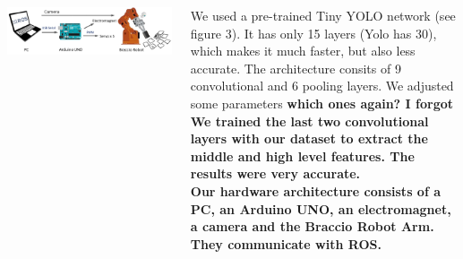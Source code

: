 \documentclass[25pt, a0paper, landscape]{tikzposter}
\begin{document}
\begin{columns}
{ 				\begin{minipage}{\columnwidth}
 					\begin{minipage}{800 pt}
			  	    	\begin{tikzfigure}
			  	    		\includegraphics[width = 800 pt]{hardware_structure2}
			  	    	\end{tikzfigure}
 					\end{minipage}
 					\hspace{50 pt}
 					\begin{minipage}{500 pt}
 						\normalfont
						We used a pre-trained Tiny YOLO network (see figure 3). It has only 15 layers (Yolo has 30), which makes it much faster, but also less accurate. The architecture consits of 9 convolutional and 6 pooling layers. We adjusted some parameters \bfseries{which ones again? I forgot}\\
						\normalfont We trained the last two convolutional layers with our dataset to extract the middle and high level features. The results were very accurate.\\
						Our hardware architecture consists of a PC, an Arduino UNO, an electromagnet, a camera and the Braccio Robot Arm. They communicate with ROS.
 					\end{minipage}
 				\end{minipage}
    }
\end{columns}
\end{document}
